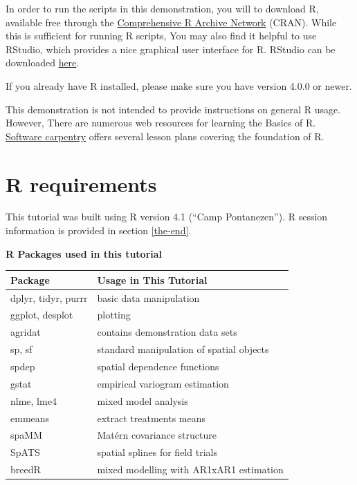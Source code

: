 \documentclass[
]{book}
\begin{document}
In order to run the scripts in this demonstration, you will to download R, available free through the \href{https://cran.r-project.org/}{Comprehensive R Archive Network} (CRAN). While this is sufficient for running R scripts, You may also find it helpful to use RStudio, which provides a nice graphical user interface for R. RStudio can be downloaded \href{https://www.rstudio.com/products/rstudio/download/}{here}.

If you already have R installed, please make sure you have version 4.0.0 or newer.

This demonstration is not intended to provide instructions on general R usage. However, There are numerous web resources for learning the Basics of R. \href{https://software-carpentry.org/lessons/}{Software carpentry} offers several lesson plans covering the foundation of R.

\hypertarget{r-requirements}{%
\section{R requirements}\label{r-requirements}}

This tutorial was built using R version 4.1 (``Camp Pontanezen''). R session information is provided in section \ref{the-end}.

\textbf{R Packages used in this tutorial}

\begin{longtable}[]{@{}ll@{}}
\toprule\noalign{}
Package & Usage in This Tutorial \\
\midrule\noalign{}
\endhead
\bottomrule\noalign{}
\endlastfoot
dplyr, tidyr, purrr & basic data manipulation \\
ggplot, desplot & plotting \\
agridat & contains demonstration data sets \\
sp, sf & standard manipulation of spatial objects \\
spdep & spatial dependence functions \\
gstat & empirical variogram estimation \\
nlme, lme4 & mixed model analysis \\
emmeans & extract treatments means \\
spaMM & Matérn covariance structure \\
SpATS & spatial splines for field trials \\
breedR & mixed modelling with AR1xAR1 estimation \\
\end{longtable}
\end{document}
